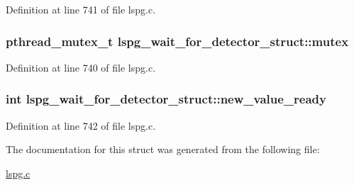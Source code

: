 Definition at line 741 of file lspg.\-c.

\hypertarget{structlspg__wait__for__detector__struct_a958e9fe59e671e61f95c2ce796ba24ce}{
\subsubsection[{mutex}]{\setlength{\rightskip}{0pt plus 5cm}pthread\-\_\-mutex\-\_\-t lspg\-\_\-wait\-\_\-for\-\_\-detector\-\_\-struct\-::mutex}}\label{structlspg__wait__for__detector__struct_a958e9fe59e671e61f95c2ce796ba24ce}


Definition at line 740 of file lspg.\-c.

\hypertarget{structlspg__wait__for__detector__struct_ad950e85c70c4473c5c7c40f8ceeae61d}{
\subsubsection[{new\-\_\-value\-\_\-ready}]{\setlength{\rightskip}{0pt plus 5cm}int lspg\-\_\-wait\-\_\-for\-\_\-detector\-\_\-struct\-::new\-\_\-value\-\_\-ready}}\label{structlspg__wait__for__detector__struct_ad950e85c70c4473c5c7c40f8ceeae61d}


Definition at line 742 of file lspg.\-c.



The documentation for this struct was generated from the following file\-:\begin{DoxyCompactItemize}
\item 
\hyperlink{lspg_8c}{lspg.\-c}\end{DoxyCompactItemize}

